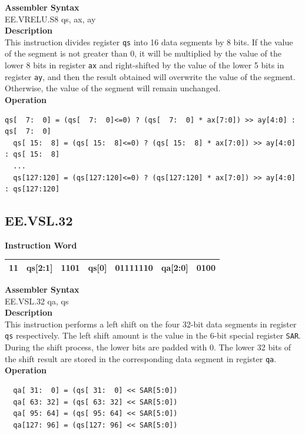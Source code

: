 \textbf{Assembler Syntax} \\
EE.VRELU.S8 qs, ax, ay \\
\textbf{Description} \\
This instruction divides register \lstinline{qs} into 16 data segments by 8 bits. If the value of the segment is not greater than 0, it will be multiplied by the value of the lower 8 bits in register \lstinline{ax} and right-shifted by the value of the lower 5 bits in register \lstinline{ay}, and then the result obtained will overwrite the value of the segment. Otherwise, the value of the segment will remain unchanged.\\
\textbf{Operation}
\begin{lstlisting}[escapeinside=`?]
  qs[  7:  0] = (qs[  7:  0]<=0) ? (qs[  7:  0] * ax[7:0]) >> ay[4:0] : qs[  7:  0]
  qs[ 15:  8] = (qs[ 15:  8]<=0) ? (qs[ 15:  8] * ax[7:0]) >> ay[4:0] : qs[ 15:  8]
  ...
  qs[127:120] = (qs[127:120]<=0) ? (qs[127:120] * ax[7:0]) >> ay[4:0] : qs[127:120]
\end{lstlisting}

\clearpage
\subsection{EE.VSL.32}\label{instruction:EEVSL32}
\setlength\tabcolsep{6pt}
\textbf{Instruction Word} \\
\begin{tabular}{|c|c|c|c|c|c|c|}
	\hline
	11 & qs[2:1] & 1101 & qs[0] & 01111110 & qa[2:0] & 0100 \\
	\hline
\end{tabular}

\textbf{Assembler Syntax} \\
EE.VSL.32 qa, qs \\
\textbf{Description} \\
This instruction performs a left shift on the four 32-bit data segments in register \lstinline{qs} respectively. The left shift amount is the value in the 6-bit special register \lstinline{SAR}. During the shift process, the lower bits are padded with 0. The lower 32 bits of the shift result are stored in the corresponding data segment in register \lstinline{qa}.\\
\textbf{Operation}
\begin{lstlisting}
  qa[ 31:  0] = (qs[ 31:  0] << SAR[5:0])
  qa[ 63: 32] = (qs[ 63: 32] << SAR[5:0])
  qa[ 95: 64] = (qs[ 95: 64] << SAR[5:0])
  qa[127: 96] = (qs[127: 96] << SAR[5:0])
\end{lstlisting}




